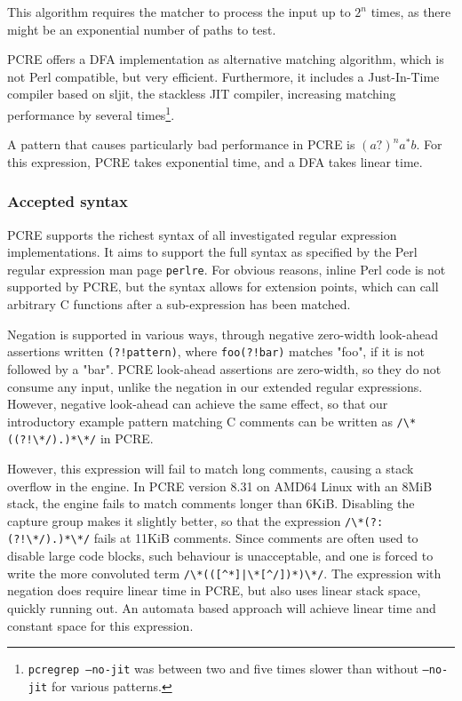 This algorithm requires the matcher to process the input up to $2^n$ times, as
there might be an exponential number of paths to test.

PCRE offers a DFA implementation as alternative matching algorithm, which is not
Perl compatible, but very efficient. Furthermore, it includes a Just-In-Time
compiler based on sljit, the stackless JIT compiler, increasing matching
performance by several times\footnote{\texttt{pcregrep --no-jit} was between two
and five times slower than without \texttt{--no-jit} for various patterns.}.

A pattern that causes particularly bad performance in PCRE is $(a?)^na^*b$. For
this expression, PCRE takes exponential time, and a DFA takes linear time.


\subsubsection{Accepted syntax}

PCRE supports the richest syntax of all investigated regular expression
implementations. It aims to support the full syntax as specified by the Perl
regular expression man page \texttt{perlre}. For obvious reasons, inline Perl
code is not supported by PCRE, but the syntax allows for extension points, which
can call arbitrary C functions after a sub-expression has been matched.

Negation is supported in various ways, through negative zero-width look-ahead
assertions written \verb'(?!pattern)', where \verb'foo(?!bar)' matches "foo", if
it is not followed by a "bar". PCRE look-ahead assertions are zero-width, so
they do not consume any input, unlike the negation in our extended regular
expressions. However, negative look-ahead can achieve the same effect, so that
our introductory example pattern matching C comments can be written as
\verb'/\*((?!\*/).)*\*/' in PCRE.

However, this expression will fail to match long comments, causing a stack
overflow in the engine. In PCRE version 8.31 on AMD64 Linux with an 8MiB stack,
the engine fails to match comments longer than 6KiB. Disabling the capture group
makes it slightly better, so that the expression \verb'/\*(?:(?!\*/).)*\*/'
fails at 11KiB comments. Since comments are often used to disable large code
blocks, such behaviour is unacceptable, and one is forced to write the more
convoluted term \verb'/\*(([^*]|\*[^/])*)\*/'. The expression with negation does
require linear time in PCRE, but also uses linear stack space, quickly running
out. An automata based approach will achieve linear time and constant space for
this expression.


